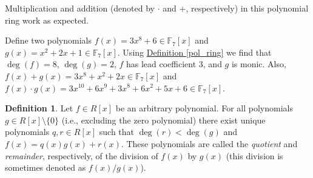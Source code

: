 \documentclass[openany, a4paper, 10pt]{book}
\theoremstyle{plain}
\theoremstyle{plain}
\theoremstyle{plain}
\theoremstyle{definition}
\newtheorem{definition}[theorem]{Definition}
\theoremstyle{plain}
\theoremstyle{definition}
\theoremstyle{remark}
\newcommand{\defref}[1]{\hyperref[#1]{Definition \ref{#1}}}
\begin{document}
Multiplication and addition (denoted by $\cdot$ and $+$, respectively) in this polynomial ring work as expected.
\begin{examplebox}
    Define two polynomials $f(x)=3x^8+6 \in \mathbb F_7[x]$ and $g(x) = x^2 + 2x + 1 \in \mathbb F_7[x]$.
    Using \defref{pol_ring} we find that $\deg(f) = 8$, $\deg(g)=2$, $f$ has lead coefficient 3, and $g$ is monic.
    Also, $f(x) + g(x) = 3x^8 + x^2 + 2x \in \mathbb F_7[x]$ and
    $f(x) \cdot g(x) = 3x^{10} + 6x^9 + 3x^8 + 6x^2 + 5x + 6 \in \mathbb F_7[x]$.
\end{examplebox}

\begin{definition}\label{quot_rem}
    Let $f \in R[x]$ be an arbitrary polynomial.
    For all polynomials $g \in R[x]\setminus \{ 0 \}$ (i.e., excluding the zero polynomial)
    there exist unique \cite[Theorem~3.16]{unique_quotient} polynomials $q,r \in R[x]$ such that $\deg(r) < \deg(g)$ and $f(x) = q(x)g(x) + r(x)$.
    These polynomials are called the \textit{quotient} and \textit{remainder}, respectively, of the division of $f(x)$ by $g(x)$ (this division is sometimes denoted as $f(x)/g(x)$).
\end{definition}
\end{document}
